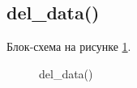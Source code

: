 \subsection{del\_data()}

Блок-схема на рисунке \ref{fig:del_data}.

\begin{figure}[p]
    \caption{del\_data()}
    \label{fig:del_data}
\end{figure}





\newpage